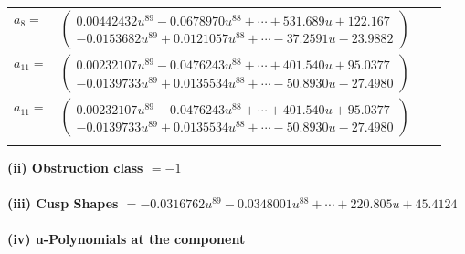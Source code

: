\documentclass[1p]{elsarticle_modified}
\theoremstyle{definition}
\begin{document}
\begin{tabular}{m{7pt} m{180pt} m{7pt} m{180pt} }
\flushright $a_{8}=$&$\begin{pmatrix}0.00442432 u^{89}-0.0678970 u^{88}+\cdots+531.689 u+122.167\\-0.0153682 u^{89}+0.0121057 u^{88}+\cdots-37.2591 u-23.9882\end{pmatrix}$ \\
\flushright $a_{11}=$&$\begin{pmatrix}0.00232107 u^{89}-0.0476243 u^{88}+\cdots+401.540 u+95.0377\\-0.0139733 u^{89}+0.0135534 u^{88}+\cdots-50.8930 u-27.4980\end{pmatrix}$\\ \flushright $a_{11}=$&$\begin{pmatrix}0.00232107 u^{89}-0.0476243 u^{88}+\cdots+401.540 u+95.0377\\-0.0139733 u^{89}+0.0135534 u^{88}+\cdots-50.8930 u-27.4980\end{pmatrix}$\\&\end{tabular}
\flushleft \textbf{(ii) Obstruction class $= -1$}\\~\\
\flushleft \textbf{(iii) Cusp Shapes $= -0.0316762 u^{89}-0.0348001 u^{88}+\cdots+220.805 u+45.4124$}\\~\\
\newpage\renewcommand{\arraystretch}{1}
\flushleft \textbf{(iv) u-Polynomials at the component}\newline \\
\end{document}
